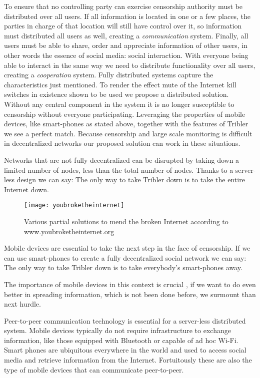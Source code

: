 To ensure that no controlling party can exercise censorship authority must be distributed over all users. %
If all information is located in one or a few places, the parties in charge of that location will still have control over it, so information must distributed all users as well, creating a \emph{communication} system.
Finally, all users must be able to share, order and appreciate information of other users, in other words the essence of social media: social interaction.
With everyone being able to interact in the same way we need to  distribute functionality over all users, creating a \emph{cooperation} system.
Fully distributed systems capture the characteristics just mentioned.
To render the effect mute of the Internet kill switches in existence shown to be used we propose a distributed solution.
Without any central component in the system it is no longer susceptible to censorship without everyone participating.
Leveraging the properties of mobile devices, like smart-phones as stated above, together with the features of Tribler we see a perfect match.
Because censorship and large scale monitoring is difficult in decentralized networks our proposed solution can work in these situations.

Networks that are not fully decentralized can be disrupted by taking down a limited number of nodes, less than the total number of nodes.
Thanks to a server-less design we can say:
The only way to take Tribler down is to take the entire Internet down.

\begin{figure}[H]
	\centering
	\texttt{[image: youbroketheinternet]}
	\caption{Various partial solutions to mend the broken Internet according to www.youbroketheinternet.org}
	\label{fig:youbroketheinternet}
\end{figure}

Mobile devices are essential to take the next step in the face of censorship.
If we can use smart-phones to create a fully decentralized social network we can say:
The only way to take Tribler down is to take everybody's smart-phones away.

The importance of mobile devices in this context is crucial , if we want to do even better in spreading information, which is not been done before, we surmount than next hurdle.

Peer-to-peer communication technology is essential for a server-less distributed system.
Mobile devices typically do not require infrastructure to exchange information, like those equipped with Bluetooth or capable of ad hoc Wi-Fi.
Smart phones are ubiquitous everywhere in the world and used to access social media and retrieve information from the Internet.
Fortuitously these are also the type of mobile devices that can communicate peer-to-peer.

